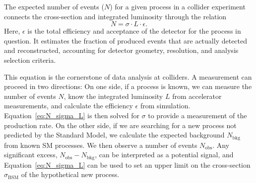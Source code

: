 The expected number of events ($N$) for a given process in a collider experiment connects the cross-section and integrated luminosity through the relation
\begin{equation}
N = \sigma \cdot L \cdot \epsilon.
\label{eq:N_sigma_L}
\end{equation}
Here, $\epsilon$ is the total efficiency and acceptance of the detector for the process in question. It estimates the fraction of produced events that are actually detected and reconstructed, accounting for detector geometry, resolution, and analysis selection criteria.

This equation is the cornerstone of data analysis at colliders. A measurement can proceed in two directions: On one side, if a process is known, we can measure the number of events $N$, know the integrated luminosity $L$ from accelerator measurements, and calculate the efficiency $\epsilon$ from simulation. Equation~\ref{eq:N_sigma_L} is then solved for $\sigma$ to provide a measurement of the production rate. On the other side, if we are searching for a new process not predicted by the Standard Model, we calculate the expected background $N_\text{bkg}$ from known SM processes. We then observe a number of events $N_\text{obs}$. Any significant excess, $N_\text{obs} - N_\text{bkg}$, can be interpreted as a potential signal, and Equation~\ref{eq:N_sigma_L} can be used to set an upper limit on the cross-section $\sigma_\text{BSM}$ of the hypothetical new process.

